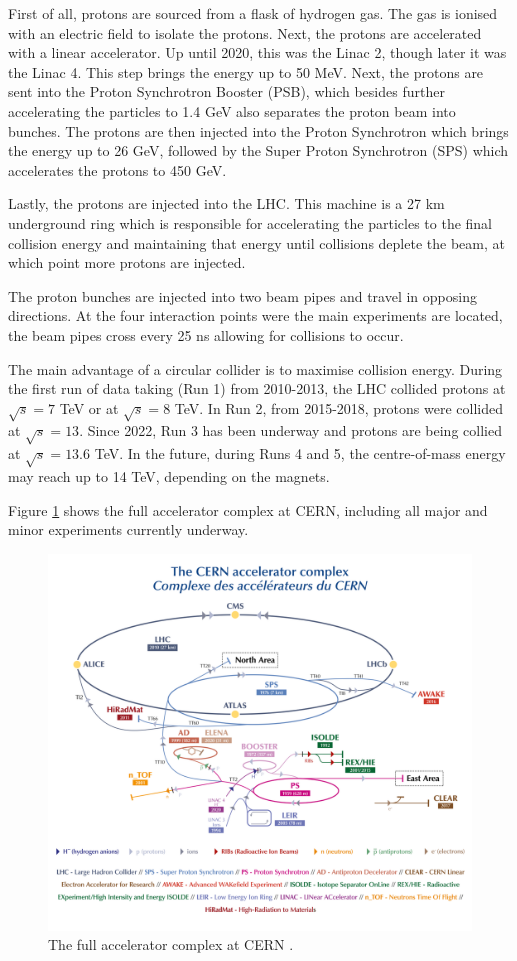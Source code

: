 \documentclass[10pt,a4paper]{book}
\begin{document}
First of all, protons are sourced from a flask of hydrogen gas. The gas is ionised with an electric field to isolate the protons. Next, the protons are accelerated with a linear accelerator. Up until 2020, this was the Linac 2, though later it was the Linac 4. This step brings the energy up to 50 MeV. Next, the protons are sent into the Proton Synchrotron Booster (PSB), which besides further accelerating the particles to 1.4 GeV also separates the proton beam into bunches. The protons are then injected into the Proton Synchrotron which brings the energy up to 26 GeV, followed by the Super Proton Synchrotron (SPS) which accelerates the protons to 450 GeV.

Lastly, the protons are injected into the LHC. This machine is a 27 km underground ring which is responsible for accelerating the particles to the final collision energy and maintaining that energy until collisions deplete the beam, at which point more protons are injected. 

The proton bunches are injected into two beam pipes and travel in opposing directions. At the four interaction points were the main experiments are located, the beam pipes cross every 25 ns allowing for collisions to occur.  

The main advantage of a circular collider is to maximise collision energy. During the first run of data taking (Run 1) from 2010-2013, the LHC collided protons at $\sqrt{s} = 7$ TeV or at $\sqrt{s} = 8$ TeV. In Run 2, from 2015-2018, protons were collided at $\sqrt{s} = 13$. Since 2022, Run 3 has been underway and protons are being collied at $\sqrt{s} = 13.6$ TeV. In the future, during Runs 4 and 5, the centre-of-mass energy may reach up to 14 TeV, depending on the magnets.

Figure \ref{lhc} shows the full accelerator complex at CERN, including all major and minor experiments currently underway.

\begin{figure}
    \centering
    \includegraphics[width=0.9\linewidth]{atlas/CCCv2019.png}
    \caption{The full accelerator complex at CERN \cite{Bartosik:2022cxq}.}
    \label{lhc}
\end{figure}
\end{document}
